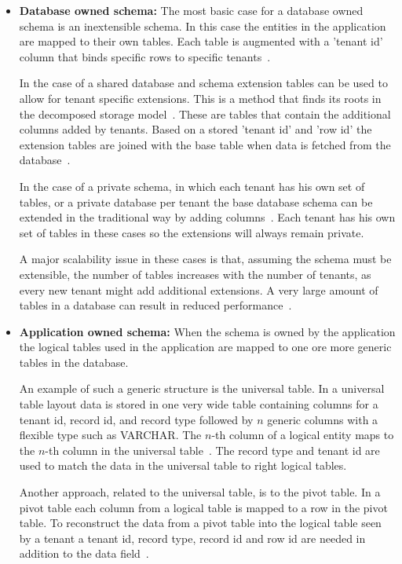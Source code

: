 \begin{itemize}
	\item \textbf{Database owned schema:} The most basic case for a database owned schema is an inextensible schema.
		In this case the entities in the application are mapped to their own tables.
		Each table is augmented with a 'tenant id' column that binds specific rows to specific tenants~\cite{aulbach2008multi}.

		In the case of a shared database and schema extension tables can be used to allow for tenant specific extensions.
		This is a method that finds its roots in the decomposed storage model~\cite{copeland1985decomposition}.
		These are tables that contain the additional columns added by tenants. 
		Based on a stored 'tenant id' and 'row id' the extension tables are joined with the base table when data is fetched from the database~\cite{aulbach2008multi}.

		In the case of a private schema, in which each tenant has his own set of tables, or a private database per tenant the base database schema can be extended in the traditional way by adding columns~\cite{aulbach2009comparison}.
		Each tenant has his own set of tables in these cases so the extensions will always remain private. 
	
		A major scalability issue in these cases is that, assuming the schema must be extensible, the number of tables increases with the number of tenants, as every new tenant might add additional extensions.
		A very large amount of tables in a database can result in reduced performance~\cite{aulbach2008multi}.
	\item \textbf{Application owned schema:} When the schema is owned by the application the logical tables used in the application are mapped to one ore more generic tables in the database.
		
		An example of such a generic structure is the universal table. 
		In a universal table layout data is stored in one very wide table containing columns for a tenant id, record id, and record type followed by $n$ generic columns with a flexible type such as VARCHAR.
		The $n$-th column of a logical entity maps to the $n$-th column in the universal table~\cite{aulbach2008multi}. The record type and tenant id are used to match the data in the universal table to right logical tables.

		Another approach, related to the universal table, is to the pivot table. 
		In a pivot table each column from a logical table is mapped to a row in the pivot table.
		To reconstruct the data from a pivot table into the logical table seen by a tenant a tenant id, record type, record id and row id are needed in addition to the data field~\cite{aulbach2008multi}.


\end{itemize}
